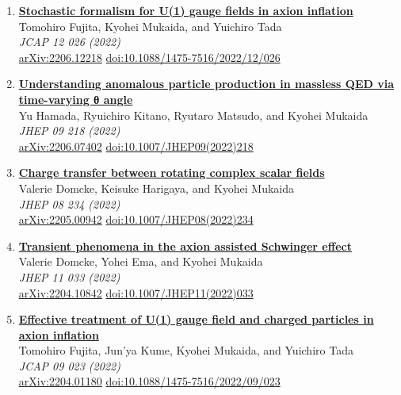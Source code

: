 \begin{enumerate}
\item \textbf{\href{https://arxiv.org/abs/2206.12218}{Stochastic formalism for U(1) gauge fields in axion inflation}}\\
Tomohiro Fujita, Kyohei Mukaida, and Yuichiro Tada\\
\emph{JCAP 12 026 (2022)}
\\ \href{https://arxiv.org/abs/2206.12218}{arXiv:2206.12218} \href{https://doi.org/10.1088/1475-7516/2022/12/026}{doi:10.1088/1475-7516/2022/12/026}

\item \textbf{\href{https://arxiv.org/abs/2206.07402}{Understanding anomalous particle production in massless QED via time-varying θ angle}}\\
Yu Hamada, Ryuichiro Kitano, Ryutaro Matsudo, and Kyohei Mukaida\\
\emph{JHEP 09 218 (2022)}
\\ \href{https://arxiv.org/abs/2206.07402}{arXiv:2206.07402} \href{https://doi.org/10.1007/JHEP09(2022)218}{doi:10.1007/JHEP09(2022)218}

\item \textbf{\href{https://arxiv.org/abs/2205.00942}{Charge transfer between rotating complex scalar fields}}\\
Valerie Domcke, Keisuke Harigaya, and Kyohei Mukaida\\
\emph{JHEP 08 234 (2022)}
\\ \href{https://arxiv.org/abs/2205.00942}{arXiv:2205.00942} \href{https://doi.org/10.1007/JHEP08(2022)234}{doi:10.1007/JHEP08(2022)234}

\item \textbf{\href{https://arxiv.org/abs/2204.10842}{Transient phenomena in the axion assisted Schwinger effect}}\\
Valerie Domcke, Yohei Ema, and Kyohei Mukaida\\
\emph{JHEP 11 033 (2022)}
\\ \href{https://arxiv.org/abs/2204.10842}{arXiv:2204.10842} \href{https://doi.org/10.1007/JHEP11(2022)033}{doi:10.1007/JHEP11(2022)033}

\item \textbf{\href{https://arxiv.org/abs/2204.01180}{Effective treatment of U(1) gauge field and charged particles in axion inflation}}\\
Tomohiro Fujita, Jun'ya Kume, Kyohei Mukaida, and Yuichiro Tada\\
\emph{JCAP 09 023 (2022)}
\\ \href{https://arxiv.org/abs/2204.01180}{arXiv:2204.01180} \href{https://doi.org/10.1088/1475-7516/2022/09/023}{doi:10.1088/1475-7516/2022/09/023}


\end{enumerate}
